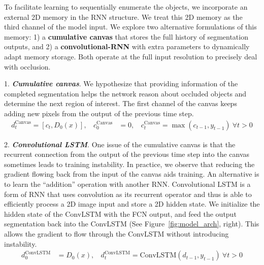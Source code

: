 

To facilitate learning to sequentially enumerate the objects, we incorporate an
external 2D memory in the RNN structure. We treat this 2D memory as the third
channel of the model input. We explore two alternative formulations of this
memory: 1) a \textbf{cumulative canvas} that stores the full history of
segmentation outputs, and 2) a \textbf{convolutional-RNN} with extra parameters
to dynamically adapt memory storage. Both operate at the full input resolution
to precisely deal with occlusion.

1. \textbf{\textit{Cumulative canvas}}. We hypothesize that providing
information of the completed segmentation helps the network reason about
occluded objects and determine the next region of interest. The first channel of
the canvas keeps adding new pixels from the output of the previous time step.
\vspace{-1pt}
\begin{align}
d_t^{\text{Canvas}} = \left[c_{t}, D_0(x)\right], \ \ \ \ 
c_0^{\text{Canvas}} &= 0, \ \ \ \
c_t^{\text{Canvas}} = \max(c_{t-1}, y_{t-1}) \ \forall t > 0
\end{align}
\vspace{-4pt}

2. \textbf{\textit{Convolutional LSTM}}. One issue of the cumulative canvas is
that the recurrent connection from the output of the previous time step into
the canvas sometimes leads to training instability. In practice, we observe
that reducing the gradient flowing back from the input of the canvas  aids
training. An alternative is to learn the ``addition'' operation with another
RNN. Convolutional LSTM \cite{shi2015convlstm} is a form of RNN that uses
convolution as its recurrent operator and thus is able to efficiently process
a 2D image input and store a 2D hidden state. We initialize the hidden state of
the ConvLSTM with the FCN output, and feed the output segmentation back
into the ConvLSTM (See Figure~\ref{fig:model_arch}, right). This allows the
gradient to flow through the ConvLSTM without introducing instability.
\vspace{-1pt}
\begin{align}
d_0^{\text{ConvLSTM}} &= D_0(x),\ \ \ \ 
d_{t}^{\text{ConvLSTM}} = \text{ConvLSTM}(d_{t-1}, y_{t-1}) \ \forall t > 0
\end{align}
\vspace{-6pt}

